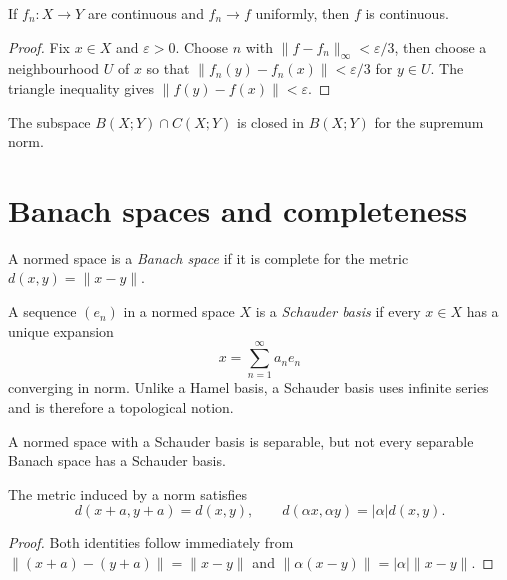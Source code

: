 \begin{notetheorem}
If $f_n\colon X\to Y$ are continuous and $f_n\to f$ uniformly, then $f$ is
continuous.
\end{notetheorem}

\begin{proof}
Fix $x\in X$ and $\varepsilon>0$.  Choose $n$ with
$\|f-f_n\|_\infty<\varepsilon/3$, then choose a neighbourhood $U$ of $x$
so that $\|f_n(y)-f_n(x)\|<\varepsilon/3$ for $y\in U$.  The triangle
inequality gives $\|f(y)-f(x)\|<\varepsilon$.
\end{proof}

\begin{notecorollary}
The subspace $B(X;Y)\cap C(X;Y)$ is closed in $B(X;Y)$ for the supremum
norm.
\end{notecorollary}

\section{Banach spaces and completeness}

\begin{notedefinition}
A normed space is a \emph{Banach space} if it is complete for the metric
$d(x,y)=\|x-y\|$.
\end{notedefinition}

\begin{notedefinition}
A sequence $(e_n)$ in a normed space $X$ is a \emph{Schauder basis} if every
$x\in X$ has a unique expansion
\[
  x=\sum_{n=1}^{\infty}a_ne_n
\]
converging in norm.  Unlike a Hamel basis, a Schauder basis uses infinite
series and is therefore a topological notion.
\end{notedefinition}

\begin{noteremark}
A normed space with a Schauder basis is separable, but not every separable
Banach space has a Schauder basis.
\end{noteremark}

\begin{notelemma}
The metric induced by a norm satisfies
\[
  d(x+a,y+a)=d(x,y),
  \qquad
  d(\alpha x,\alpha y)=|\alpha|d(x,y).
\]
\end{notelemma}

\begin{proof}
Both identities follow immediately from
$\|(x+a)-(y+a)\|=\|x-y\|$ and
$\|\alpha(x-y)\|=|\alpha|\|x-y\|$.
\end{proof}

